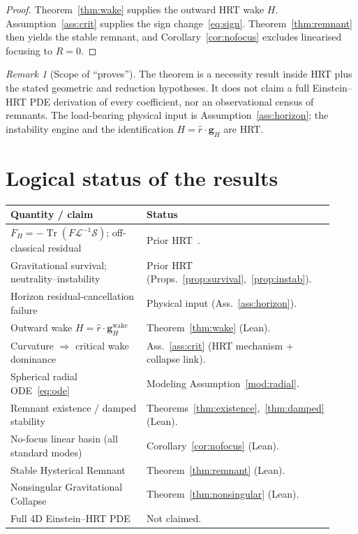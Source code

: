 \documentclass[11pt]{article}
\theoremstyle{definition}
\theoremstyle{remark}
\newtheorem{remark}[theorem]{Remark}
\newcommand{\FH}{F_H}
\newcommand{\Tr}{\operatorname{Tr}}
\begin{document}
\begin{proof}
Theorem~\ref{thm:wake} supplies the outward HRT wake $H$.
Assumption~\ref{ass:crit} supplies the sign change~\eqref{eq:sign}.
Theorem~\ref{thm:remnant} then yields the stable remnant, and
Corollary~\ref{cor:nofocus} excludes linearised focusing to $R=0$.
\end{proof}

\begin{remark}[Scope of ``proves'']
\label{rem:proves}
The theorem is a necessity result inside HRT plus the stated geometric and reduction
hypotheses.
It does not claim a full Einstein--HRT PDE derivation of every coefficient, nor an
observational census of remnants.
The load-bearing physical input is Assumption~\ref{ass:horizon}; the instability engine
and the identification $H=\hat r\cdot\mathbf g_H$ are HRT.
\end{remark}

\section{Logical status of the results}
\label{sec:status}
\begin{center}
\small
\begin{tabular}{@{}p{0.48\linewidth}p{0.44\linewidth}@{}}
\toprule
\textbf{Quantity / claim} & \textbf{Status}\\
\midrule
$\FH=-\Tr(F\mathcal L^{-1}\mathcal S)$; off-classical residual & Prior HRT~\cite{boyd2026response}.\\
Gravitational survival; neutrality--instability & Prior HRT (Props.~\ref{prop:survival},~\ref{prop:instab}).\\
Horizon residual-cancellation failure & Physical input (Ass.~\ref{ass:horizon}).\\
Outward wake $H=\hat r\cdot\mathbf g_H^{\mathrm{wake}}$ & Theorem~\ref{thm:wake} (Lean).\\
Curvature $\Rightarrow$ critical wake dominance & Ass.~\ref{ass:crit} (HRT mechanism + collapse link).\\
Spherical radial ODE~\eqref{eq:ode} & Modeling Assumption~\ref{mod:radial}.\\
Remnant existence / damped stability & Theorems~\ref{thm:existence},~\ref{thm:damped} (Lean).\\
No-focus linear basin (all standard modes) & Corollary~\ref{cor:nofocus} (Lean).\\
Stable Hysterical Remnant & Theorem~\ref{thm:remnant} (Lean).\\
Nonsingular Gravitational Collapse & Theorem~\ref{thm:nonsingular} (Lean).\\
Full 4D Einstein--HRT PDE & Not claimed.\\
\bottomrule
\end{tabular}
\end{center}
\end{document}
